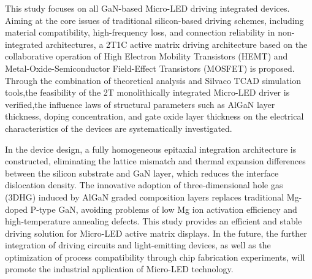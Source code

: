 \documentclass[
    oneside,                %
    fontset = win, %
  ]{njuthesis}
\begin{document}
\begin{abstract*}
 
This study focuses on all GaN-based Micro-LED driving integrated devices. Aiming at the core issues of traditional silicon-based driving schemes, including material compatibility, high-frequency loss, and connection reliability in non-integrated architectures, a 2T1C active matrix driving architecture based on the collaborative operation of High Electron Mobility Transistors (HEMT) and Metal-Oxide-Semiconductor Field-Effect Transistors (MOSFET) is proposed. Through the combination of theoretical analysis and Silvaco TCAD simulation tools,the feasibility of the 2T monolithically integrated Micro-LED driver is verified,the influence laws of structural parameters such as AlGaN layer thickness, doping concentration, and gate oxide layer thickness on the electrical characteristics of the devices are systematically investigated.

In the device design, a fully homogeneous epitaxial integration architecture is constructed, eliminating the lattice mismatch and thermal expansion differences between the silicon substrate and GaN layer, which reduces the interface dislocation density. The innovative adoption of three-dimensional hole gas (3DHG) induced by AlGaN graded composition layers replaces traditional Mg-doped P-type GaN, avoiding problems of low Mg ion activation efficiency and high-temperature annealing defects. This study provides an efficient and stable driving solution for Micro-LED active matrix displays. In the future, the further integration of driving circuits and light-emitting devices, as well as the optimization of process compatibility through chip fabrication experiments, will promote the industrial application of Micro-LED technology.
  
\end{abstract*}

\tableofcontents

\mainmatter

\end{document}
